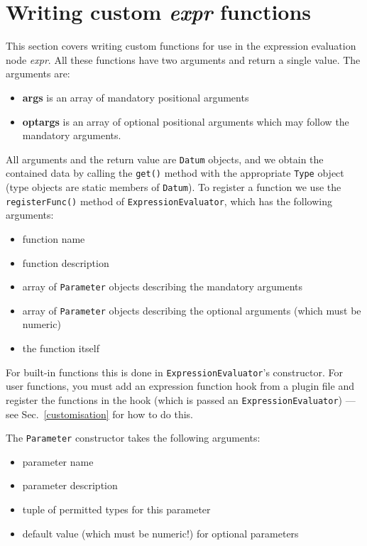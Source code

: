 

\section{Writing custom \emph{expr} functions}
\label{writingfuncs}
This section covers writing custom functions for use in the expression evaluation node \emph{expr}.
All these functions have two arguments and return a single value. The arguments are:
\begin{itemize}
\item \textbf{args} is an array of mandatory positional arguments
\item \textbf{optargs} is an array of optional positional arguments which may follow the mandatory arguments.
\end{itemize}
All arguments and the return value are \texttt{Datum} objects, and we obtain the contained data by calling
the \texttt{get()} method with the appropriate \texttt{Type} object (type objects are static members of
\texttt{Datum}).
To register a function we use the \texttt{registerFunc()} method of \texttt{ExpressionEvaluator}, which
has the following arguments:
\begin{itemize}
\item function name
\item function description
\item array of \texttt{Parameter} objects describing the mandatory arguments
\item array of \texttt{Parameter} objects describing the optional arguments (which must be numeric)
\item the function itself
\end{itemize}
For built-in functions this is done in \texttt{ExpressionEvaluator}'s
constructor. For user functions, you must add an expression function hook from
a plugin file and register the functions in the hook (which is passed an
\texttt{ExpressionEvaluator}) --- see Sec.~\ref{customisation} for how to do
this.

The \texttt{Parameter} constructor takes the following arguments:
\begin{itemize}
\item parameter name
\item parameter description
\item tuple of permitted types for this parameter
\item default value (which must be numeric!) for optional parameters
\end{itemize}

